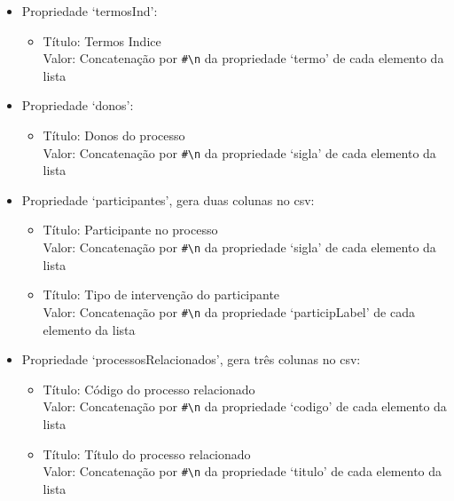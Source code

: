 \begin{itemize}
\begin{itemize}
\begin{itemize}
\begin{itemize}
                \item Título: Notas de exclusão \\
                      Valor: Concatenação por \verb|#\n| da propriedade `nota' de cada elemento da lista
            \end{itemize}
            \item Propriedade `termosInd':
            \begin{itemize}
                \item Título: Termos Indice \\
                      Valor: Concatenação por \verb|#\n| da propriedade `termo' de cada elemento da lista
            \end{itemize}
            \item Propriedade `donos':
            \begin{itemize}
                \item Título: Donos do processo \\
                      Valor: Concatenação por \verb|#\n| da propriedade `sigla' de cada elemento da lista
            \end{itemize}
            \item Propriedade `participantes', gera duas colunas no \acrshort{csv}:
            \begin{itemize}
                \item Título: Participante no processo \\
                      Valor: Concatenação por \verb|#\n| da propriedade `sigla' de cada elemento da lista
                \item Título: Tipo de intervenção do participante \\
                      Valor: Concatenação por \verb|#\n| da propriedade `participLabel' de cada elemento da lista
            \end{itemize}
            \item Propriedade `processosRelacionados', gera três colunas no \acrshort{csv}:
            \begin{itemize}
                \item Título: Código do processo relacionado \\
                      Valor: Concatenação por \verb|#\n| da propriedade `codigo' de cada elemento da lista
                \item Título: Título do processo relacionado \\
                      Valor: Concatenação por \verb|#\n| da propriedade `titulo' de cada elemento da lista

\end{itemize}
\end{itemize}
\end{itemize}
\end{itemize}
